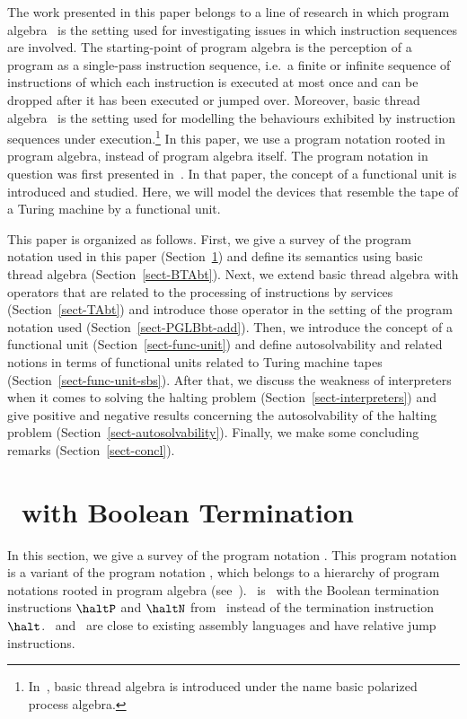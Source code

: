 \documentclass[fleqn]{llncs}
\begin{document}
The work presented in this paper belongs to a line of research in which
program algebra~\cite{BL02a} is the setting used for investigating
issues in which instruction sequences are involved.
The starting-point of program algebra is the perception of a program as
a single-pass instruction sequence, i.e.\ a finite or infinite sequence
of instructions of which each instruction is executed at most once and
can be dropped after it has been executed or jumped over.
Moreover, basic thread algebra~\cite{BL02a} is the setting used for
modelling the behaviours exhibited by instruction sequences under
execution.\footnote
{In~\cite{BL02a}, basic thread algebra is introduced under the name
 basic polarized process algebra.
}
In this paper, we use a program notation rooted in program algebra,
instead of program algebra itself.
The program notation in question was first presented in~\cite{BM09l}.
In that paper, the concept of a functional unit is introduced and
studied.
Here, we will model the devices that resemble the tape of a Turing
machine by a functional unit.

This paper is organized as follows.
First, we give a survey of the program notation used in this paper
(Section~\ref{sect-PGLBbt}) and define its semantics using basic thread
algebra (Section~\ref{sect-BTAbt}).
Next, we extend basic thread algebra with operators that are related to
the processing of instructions by services (Section~\ref{sect-TAbt}) and
introduce those operator in the setting of the program notation used
(Section~\ref{sect-PGLBbt-add}).
Then, we introduce the concept of a functional unit
(Section~\ref{sect-func-unit}) and define autosolvability and related
notions in terms of functional units related to Turing machine tapes
(Section~\ref{sect-func-unit-sbs}).
After that, we discuss the weakness of interpreters when it comes to
solving the halting problem (Section~\ref{sect-interpreters}) and give
positive and negative results concerning the autosolvability of the
halting problem (Section~\ref{sect-autosolvability}).
Finally, we make some concluding remarks (Section~\ref{sect-concl}).

\section{\PGLB\ with Boolean Termination}
\label{sect-PGLBbt}

In this section, we give a survey of the program notation \PGLBbt.
This program notation is a variant of the program notation \PGLB, which
belongs to a hierarchy of program notations rooted in program algebra
(see~\cite{BL02a}).
\PGLBbt\ is \PGLB\ with the Boolean termination instructions $\haltP$
and $\haltN$ from~\cite{BM09k} instead of the termination instruction
$\halt$.
\PGLB\ and \PGLBbt\ are close to existing assembly languages and have
relative jump instructions.
\end{document}
